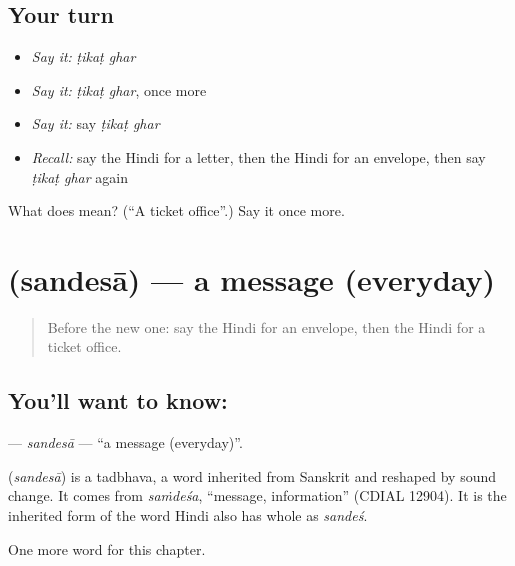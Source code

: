 \subsection*{Your turn}
\begin{itemize}
\raggedright
  \item \emph{Say it:} \emph{ṭikaṭ ghar}
  \item \emph{Say it:} \emph{ṭikaṭ ghar}, once more
  \item \emph{Say it:} say \emph{ṭikaṭ ghar}
  \item \emph{Recall:} say the Hindi for a letter, then the Hindi for an envelope, then say \emph{ṭikaṭ ghar} again
\end{itemize}

\begin{tcolorbox}[breakable,colback=teal!4,colframe=teal!35!black,title={Before you move on}]
What does   mean? (\textquotedblleft{}A ticket office\textquotedblright{}.) Say it once more.
\end{tcolorbox}
\section[\texorpdfstring{\hi{संदेसा} (sandesā)}{संदेसा (sandesā)}]{ (sandesā) — a message (everyday)}

\label{lesson:HI-C205-sandesa}



\begin{quote}
Before the new one: say the Hindi for an envelope, then the Hindi for a ticket office.
\end{quote}

\subsection*{You'll want to know: }
\textbf{} — \emph{sandesā} — \textquotedblleft{}a message (everyday)\textquotedblright{}.

\begin{cousinweb}
\textbf{} (\emph{sandesā}) is a tadbhava, a word inherited from Sanskrit and reshaped by sound change. It comes from \emph{saṁdeśa}, \textquotedblleft{}message, information\textquotedblright{} (CDIAL 12904). It is the inherited form of the word Hindi also has whole as \emph{sandeś}.
\end{cousinweb}

\begin{grammarlens}[title={What you've built}]
One more word for this chapter.
\end{grammarlens}

